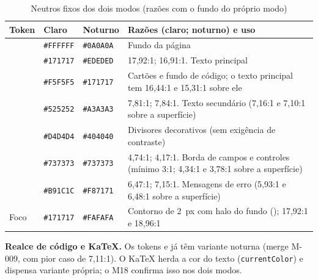 \begin{table}[htb]
\caption{Neutros fixos dos dois modos (razões com o fundo do próprio modo)}\label{tab:neutros}
\small
\begin{tabularx}{\linewidth}{@{}L{3.1cm}L{2.0cm}L{2.0cm}Y@{}}
\toprule
\textbf{Token} & \textbf{Claro} & \textbf{Noturno} & \textbf{Razões (claro; noturno) e uso}\\
\midrule
{} & \texttt{\#FFFFFF} & \texttt{\#0A0A0A} & Fundo da página\\
 & \texttt{\#171717} & \texttt{\#EDEDED} & 17,92:1; 16,91:1. Texto principal\\
 & \texttt{\#F5F5F5} & \texttt{\#171717} & Cartões e fundo de código; o texto principal tem 16,44:1 e 15,31:1 sobre ele\\
 & \texttt{\#525252} & \texttt{\#A3A3A3} & 7,81:1; 7,84:1. Texto secundário (7,16:1 e 7,10:1 sobre a superfície)\\
 & \texttt{\#D4D4D4} & \texttt{\#404040} & Divisores decorativos (sem exigência de contraste)\\
 & \texttt{\#737373} & \texttt{\#737373} & 4,74:1; 4,17:1. Borda de campos e controles (mínimo 3:1; 4,34:1 e 3,78:1 sobre a superfície)\\
 & \texttt{\#B91C1C} & \texttt{\#F87171} & 6,47:1; 7,15:1. Mensagens de erro (5,93:1 e 6,48:1 sobre a superfície)\\
Foco & \texttt{\#171717} & \texttt{\#FAFAFA} & Contorno de 2~px com halo do fundo (); 17,92:1 e 18,96:1\\
\bottomrule
\end{tabularx}
\end{table}

\textbf{Realce de código e KaTeX.} Os tokens  e  já têm variante noturna (merge M-009, com pior caso de 7,11:1). O KaTeX herda a cor do texto (\texttt{currentColor}) e dispensa variante própria; o M18 confirma isso nos dois modos.

